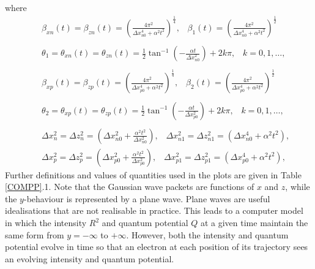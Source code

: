 \documentclass[12pt]{article}       %
\begin{document}
where
\begin{eqnarray}
&&\!\!\!\!\!\!\!\!\!\!\!\!\!\beta_{xn}(t)=\beta_{zn}(t) =\left( \frac{4\pi^2}{\Delta x_{n0}^4+\alpha^2 t^2}\right)^{\frac{1}{4}},\;\;\;\beta_{1}(t)=\left( \frac{4\pi^2}{\Delta x_{n0}^4+\alpha^2 t^2}\right)^{\frac{1}{2}}\nonumber\\ \nonumber\\
&&\!\!\!\!\!\!\!\!\!\!\!\!\!\theta_1=\theta_{xn}(t)=\theta_{zn}(t)  =\frac{1}{2} \tan^{-1} \left(-\frac{\alpha t}{\Delta x_{n0}^2}  \right)+2k\pi,\;\;\;k=0,1,\ldots,\nonumber\\ \nonumber\\
&&\!\!\!\!\!\!\!\!\!\!\!\!\!\beta_{xp}(t)=\beta_{zp}(t) =\left( \frac{4\pi^2}{\Delta x_{p0}^4+\alpha^2 t^2}\right)^{\frac{1}{4}},\;\;\;\beta_{2}(t)=\left( \frac{4\pi^2}{\Delta x_{p0}^4+\alpha^2 t^2}\right)^{\frac{1}{2}}\nonumber\\ \nonumber\\
&&\!\!\!\!\!\!\!\!\!\!\!\!\!\theta_2=\theta_{xp}(t)=\theta_{zp}(t)  =\frac{1}{2} \tan^{-1} \left(-\frac{\alpha t}{\Delta x_{p0}^2}  \right)+2k\pi,\;\;\;k=0,1,\ldots,\nonumber\\ \nonumber\\
&&\!\!\!\!\!\!\!\!\!\!\!\!\!\!\Delta x_n^2=\Delta z_n^2 =\left(\Delta x_{n0}^2+\frac{\alpha^2 t^2}{\Delta x_{n0}^2}\right),\;\;\;\Delta x_{n1}^2=\Delta z_{n1}^2=\left(\Delta x_{n0}^4+\alpha^2 t^2\right),\nonumber\\
&&\!\!\!\!\!\!\!\!\!\!\!\!\!\!\Delta x_p^2= \Delta z_p^2 =\left(\Delta x_{p0}^2+\frac{\alpha^2 t^2}{\Delta x_{p0}^2}\right),\;\;\;\Delta x_{p1}^2=\Delta z_{p1}^2=\left(\Delta x_{p0}^4+\alpha^2 t^2\right),\nonumber
\end{eqnarray}
Further definitions and values of quantities used in the plots are given in Table \ref{COMPP}.1.   Note that  the Gaussian wave packets are functions of $x$ and $z$, while the $y$-behaviour is represented by a plane wave. Plane  waves are useful  idealisations that are not realisable in practice. This leads to a computer model in which the intensity $R^2$ and quantum potential $Q$ at a given time maintain the same form from $y=-\infty$ to $+\infty$.	However, both the intensity and quantum potential evolve in time so that an electron at each position of its trajectory sees an evolving intensity and quantum potential. 
\end{document}
